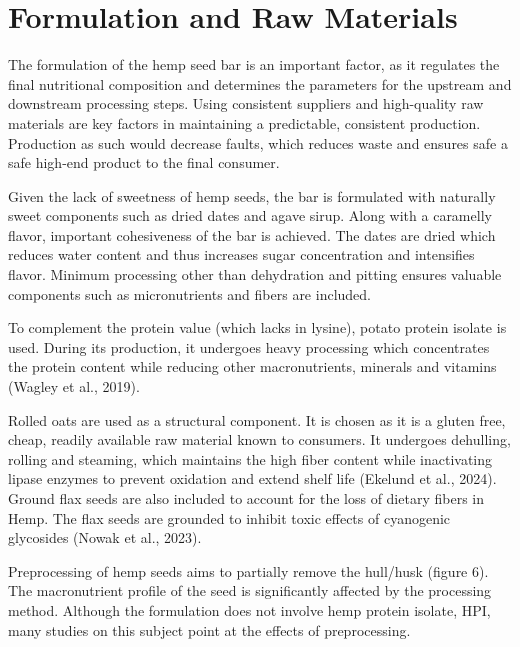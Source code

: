 \chapter{Formulation and Raw Materials}
\setlength{\headheight}{12.71342pt}
\addtolength{\topmargin}{-0.71342pt}

The formulation of the hemp seed bar is an important factor, as it regulates the final nutritional composition and determines the parameters for the upstream and downstream processing steps. Using consistent suppliers and high-quality raw materials are key factors in maintaining a predictable, consistent production. Production as such would decrease faults, which reduces waste and ensures safe a safe high-end product to the final consumer. 

\vspace{1em}
Given the lack of sweetness of hemp seeds, the bar is formulated with naturally sweet components such as dried dates and agave sirup. Along with a caramelly flavor, important cohesiveness of the bar is achieved. The dates are dried which reduces water content and thus increases sugar concentration and intensifies flavor. Minimum processing other than dehydration and pitting ensures valuable components such as micronutrients and fibers are included.

\vspace{1em}
To complement the protein value (which lacks in lysine), potato protein isolate is used. During its production, it undergoes heavy processing which concentrates the protein content while reducing other macronutrients, minerals and vitamins (Wagley et al., 2019).

\vspace{1em}
Rolled oats are used as a structural component. It is chosen as it is a gluten free, cheap, readily available raw material known to consumers. It undergoes dehulling, rolling and steaming, which maintains the high fiber content while inactivating lipase enzymes to prevent oxidation and extend shelf life (Ekelund et al., 2024). Ground flax seeds are also included to account for the loss of dietary fibers in Hemp. The flax seeds are grounded to inhibit toxic effects of cyanogenic glycosides (Nowak et al., 2023).

\vspace{1em}
Preprocessing of hemp seeds aims to partially remove the hull/husk (figure 6). The macronutrient profile of the seed is significantly affected by the processing method. Although the formulation does not involve hemp protein isolate, HPI, many studies on this subject point at the effects of preprocessing. 

